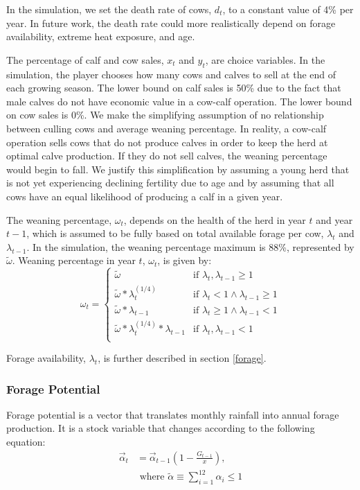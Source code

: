 \documentclass[11pt]{article}
\begin{document}
In the simulation, we set the death rate of cows, $d_t$, to a constant value of 4\% per year. In future work, the death rate could more realistically depend on forage availability, extreme heat exposure, and age. 

The percentage of calf and cow sales, $x_t$ and $y_t$, are choice variables. In the simulation, the player chooses how many cows and calves to sell at the end of each growing season. The lower bound on calf sales is 50\% due to the fact that male calves do not have economic value in a cow-calf operation. The lower bound on cow sales is 0\%. We make the simplifying assumption of no relationship between culling cows and average weaning percentage. In reality, a cow-calf operation sells cows that do not produce calves in order to keep the herd at optimal calve production. If they do not sell calves, the weaning percentage would begin to fall. We justify this simplification by assuming a young herd that is not yet experiencing declining fertility due to age and by assuming that all cows have an equal likelihood of producing a calf in a given year. 

The weaning percentage, $\omega_t$, depends on the health of the herd in year $t$ and year $t-1$, which is assumed to be fully based on total available forage per cow, $\lambda_t$ and $\lambda_{t-1}$. In the simulation, the weaning percentage maximum is 88\%, represented by $\tilde{\omega}$. Weaning percentage in year $t$, $\omega_t$, is given by:\\

\begin{equation}
\label{weaningPercentage}
\omega_t =
\begin{cases}
\tilde{\omega}  &\text{if } \lambda_{t}, \lambda_{t-1} \ge 1  \\
\tilde{\omega} * \lambda_{t}^{(1/4)} &\text{if } \lambda_{t} < 1 \land \lambda_{t-1} \ge 1 \\
\tilde{\omega} * \lambda_{t - 1} &\text{if } \lambda_{t} \ge 1 \land \lambda_{t-1} < 1 \\
\tilde{\omega} * \lambda_{t}^{(1/4)} * \lambda_{t-1} &\text{if } \lambda_{t}, \lambda_{t-1} < 1 \\
\end{cases}
\end{equation}

Forage availability, $\lambda_t$, is further described in section \ref{forage}.

\subsubsection{Forage Potential}
Forage potential is a vector that translates monthly rainfall into annual forage production. It is a stock variable that changes according to the following equation:
\begin{align}
\label{foragePotential}
\vec{\alpha}_t &= \vec{\alpha}_{t-1} \left(1 - \frac{G_{t-1}}{x}\right), \\
&\text{ where } \tilde{\alpha} \equiv \sum_{i=1}^{12} \alpha_{i}  \le 1 \label{maxforagePotential}
\end{align}
\end{document}
